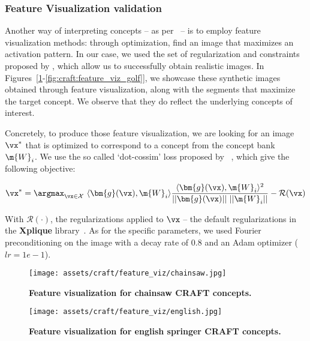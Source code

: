\clearpage

\subsubsection{Feature Visualization validation} \label{app:craft:feature-viz-val}

Another way of interpreting concepts -- as per~\cite{kim2018interpretability} -- is to employ feature visualization methods: through optimization, find an image that maximizes an activation pattern.
In our case, we used the set of regularization and constraints proposed by \cite{olah2017feature}, which allow us to successfully obtain realistic images. In Figures~[\ref{fig:craft:feature_viz_chainsaw}-\ref{fig:craft:feature_viz_golf}], we showcase these synthetic images obtained through feature visualization, along with the segments that maximize the target concept. We observe that they do reflect the underlying concepts of interest.

Concretely, to produce those feature visualization, we are looking for an image $\vx^*$ that is optimized to correspond to a concept from the concept bank $\m{W}_i$. We use the so called `dot-cossim' loss proposed by ~\cite{olah2017feature}, which give the following objective:

\begin{equation*}
    \vx^* = \argmax_{\vx \in \mathcal{X}} ~ \langle \bm{g}(\vx), \m{W}_i \rangle 
\frac{\langle \bm{g}(\vx), \m{W}_i \rangle^2}{||\bm{g}(\vx)|| ~ ||\m{W}_i||  } - \mathcal{R}(\vx)    
\end{equation*}

With $\mathcal{R}(\cdot)$, the regularizations applied to $\vx$  -- the default regularizations in the \textbf{Xplique} library~\cite{xplique}. As for the specific parameters, we used Fourier preconditioning on the image with a decay rate of $0.8$ and an Adam optimizer ($lr = 1e-1$). 

\begin{figure}[ht]
\centering
  \texttt{[image: assets/craft/feature\_viz/chainsaw.jpg]}
  \caption{ \textbf{Feature visualization for chainsaw CRAFT concepts.}
  }
  \label{fig:craft:feature_viz_chainsaw}
\end{figure}

\begin{figure}[ht]
\centering
  \texttt{[image: assets/craft/feature\_viz/english.jpg]}
  \caption{ \textbf{Feature visualization for english springer CRAFT concepts.}
  }
  \label{fig:craft:feature_viz_englishspringer}
\end{figure}

